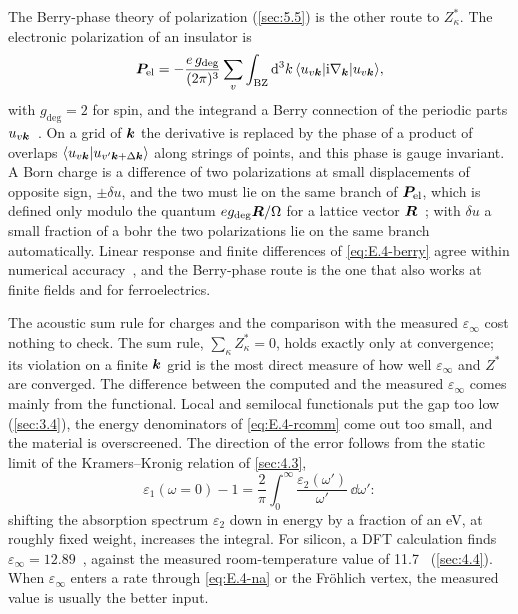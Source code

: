 The Berry-phase theory of polarization (\cref{sec:5.5}) is the other route to $Z^*_\kappa$. The electronic polarization of an insulator is
\begin{equation}
  \bm{P}_{\mathrm{el}} = -\frac{e\,g_{\mathrm{deg}}}{(2\pi)^3}\sum_{v}\int_{\mathrm{BZ}}\mathrm{d}^3k\,\langle u_{v\bm{k}}|\mathrm{i}\nabla_{\bm{k}}|u_{v\bm{k}}\rangle ,
  \label{eq:E.4-berry}
\end{equation}
with $g_{\mathrm{deg}} = 2$ for spin, and the integrand a Berry connection of the periodic parts $u_{v\bm{k}}$~\cite[Eqs.~(89)--(90)]{marzari2012maximally}. On a grid of $\bm{k}$ the derivative is replaced by the phase of a product of overlaps $\langle u_{v\bm{k}}|u_{v'\bm{k}+\Delta\bm{k}}\rangle$ along strings of points, and this phase is gauge invariant. A Born charge is a difference of two polarizations at small displacements of opposite sign, $\pm\delta u$, and the two must lie on the same branch of $\bm{P}_{\mathrm{el}}$, which is defined only modulo the quantum $e g_{\mathrm{deg}}\bm{R}/\Omega$ for a lattice vector $\bm{R}$~\cite[Sect.~V.A.1]{marzari2012maximally}; with $\delta u$ a small fraction of a bohr the two polarizations lie on the same branch automatically. Linear response and finite differences of \cref{eq:E.4-berry} agree within numerical accuracy~\cite[Sect.~II.D.2]{baroni2001phonons}, and the Berry-phase route is the one that also works at finite fields and for ferroelectrics.

The acoustic sum rule for charges and the comparison with the measured $\varepsilon_\infty$ cost nothing to check. The sum rule, $\sum_\kappa Z^*_\kappa = 0$, holds exactly only at convergence; its violation on a finite $\bm{k}$ grid is the most direct measure of how well $\varepsilon_\infty$ and $Z^*$ are converged. The difference between the computed and the measured $\varepsilon_\infty$ comes mainly from the functional. Local and semilocal functionals put the gap too low (\cref{sec:3.4}), the energy denominators of \cref{eq:E.4-rcomm} come out too small, and the material is overscreened. The direction of the error follows from the static limit of the Kramers--Kronig relation of \cref{sec:4.3},
\begin{equation}
  \varepsilon_1(\omega = 0) - 1 = \frac{2}{\pi}\int_0^\infty\frac{\varepsilon_2(\omega')}{\omega'}\,\dd\omega' :
  \label{eq:E.4-kk}
\end{equation}
shifting the absorption spectrum $\varepsilon_2$ down in energy by a fraction of an eV, at roughly fixed weight, increases the integral. For silicon, a DFT calculation finds $\varepsilon_\infty = 12.89$~\cite{ponce2018towards}, against the measured room-temperature value of 11.7~\cite{franta2017temperature} (\cref{sec:4.4}). When $\varepsilon_\infty$ enters a rate through \cref{eq:E.4-na} or the Fr\"ohlich vertex, the measured value is usually the better input.

